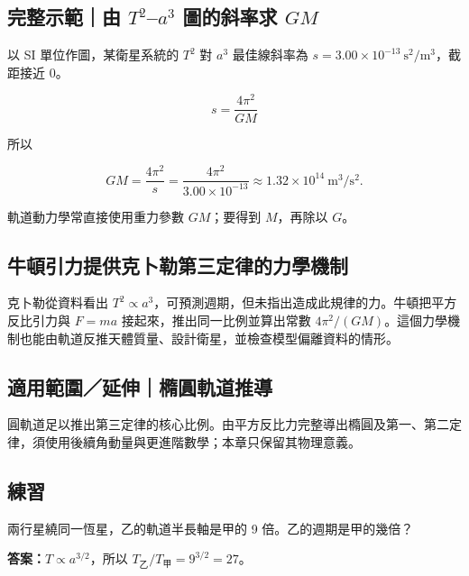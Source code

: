 \documentclass[11pt,a4paper]{article}
\begin{document}
\begin{HandoutWorkedExample}

\subsection{\texorpdfstring{完整示範｜由 \(T^2\)--\(a^3\) 圖的斜率求 \(GM\)}{完整示範｜由 T\^{}2--a\^{}3 圖的斜率求 GM}}\label{ux5b8cux6574ux793aux7bc4ux7531-t2a3-ux5716ux7684ux659cux7387ux6c42-gm}

以 SI 單位作圖，某衛星系統的 \(T^2\) 對 \(a^3\) 最佳線斜率為 \(s=3.00\times10^{-13}\ \mathrm{s^2/m^3}\)，截距接近 0。

\[
s=\frac{4\pi^2}{GM}
\]

所以

\[
GM=\frac{4\pi^2}{s}
=\frac{4\pi^2}{3.00\times10^{-13}}
\approx1.32\times10^{14}\ \mathrm{m^3/s^2}.
\]

軌道動力學常直接使用重力參數 \(GM\)；要得到 \(M\)，再除以 \(G\)。

\end{HandoutWorkedExample}

\subsection{牛頓引力提供克卜勒第三定律的力學機制}\label{ux725bux9813ux5f15ux529bux63d0ux4f9bux514bux535cux52d2ux7b2cux4e09ux5b9aux5f8bux7684ux529bux5b78ux6a5fux5236}

克卜勒從資料看出 \(T^2\propto a^3\)，可預測週期，但未指出造成此規律的力。牛頓把平方反比引力與 \(F=ma\) 接起來，推出同一比例並算出常數 \(4\pi^2/(GM)\)。這個力學機制也能由軌道反推天體質量、設計衛星，並檢查模型偏離資料的情形。

\subsection{適用範圍／延伸｜橢圓軌道推導}\label{ux9069ux7528ux7bc4ux570dux5ef6ux4f38ux6a62ux5713ux8eccux9053ux63a8ux5c0e}

圓軌道足以推出第三定律的核心比例。由平方反比力完整導出橢圓及第一、第二定律，須使用後續角動量與更進階數學；本章只保留其物理意義。

\begin{HandoutSelfCheck}

\subsection{練習}\label{ux7df4ux7fd2-3}

兩行星繞同一恆星，乙的軌道半長軸是甲的 9 倍。乙的週期是甲的幾倍？

\textbf{答案：}\(T\propto a^{3/2}\)，所以 \(T_{\text{乙}}/T_{\text{甲}}=9^{3/2}=27\)。

\end{HandoutSelfCheck}
\end{document}
